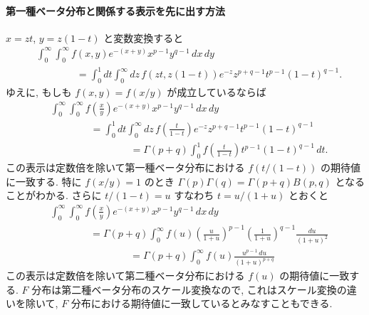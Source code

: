 \documentclass[12pt,twoside]{jarticle}
\theoremstyle{jplain}
\theoremstyle{jplain}
\theoremstyle{jplain}
\numberwithin{theorem}{section}
\numberwithin{equation}{section}
\numberwithin{figure}{section}
\numberwithin{table}{section}
\begin{document}
\paragraph{第一種ベータ分布と関係する表示を先に出す方法}
$x=zt$, $y=z(1-t)$ と変数変換すると
\begin{align*}
&
\int_0^\infty\int_0^\infty f(x,y)e^{-(x+y)}x^{p-1}y^{q-1}\,dx\,dy
\\ & \qquad\qquad
=\int_0^1 dt \int_0^\infty dz\, f(zt,z(1-t))e^{-z}z^{p+q-1}t^{p-1}(1-t)^{q-1}.
\end{align*}
ゆえに, もしも $f(x,y)=f(x/y)$ が成立しているならば
\begin{align*}
&
\int_0^\infty\int_0^\infty f\left(\frac{x}{y}\right)e^{-(x+y)}x^{p-1}y^{q-1}\,dx\,dy
\\ & \qquad\qquad
=\int_0^1 dt \int_0^\infty dz\, f\left(\frac{t}{1-t}\right)e^{-z}z^{p+q-1}t^{p-1}(1-t)^{q-1}
\\ & \qquad\qquad\qquad\qquad
=\Gamma(p+q)\int_0^1 f\left(\frac{t}{1-t}\right)t^{p-1}(1-t)^{q-1}\,dt.
\end{align*}
この表示は定数倍を除いて第一種ベータ分布における $f(t/(1-t))$ の期待値に一致する.
特に $f(x/y)=1$ のとき $\Gamma(p)\Gamma(q)=\Gamma(p+q)B(p,q)$ となることがわかる.
さらに $t/(1-t)=u$ すなわち $t=u/(1+u)$ とおくと
\begin{align*}
&
\int_0^\infty\int_0^\infty f\left(\frac{x}{y}\right)e^{-(x+y)}x^{p-1}y^{q-1}\,dx\,dy
\\ & \qquad\qquad
=\Gamma(p+q)\int_0^\infty f(u)
\left(\frac{u}{1+u}\right)^{p-1}\left(\frac{1}{1+u}\right)^{q-1}\frac{du}{(1+u)^2}
\\ & \qquad\qquad\qquad\qquad
=\Gamma(p+q)\int_0^\infty f(u)\frac{u^{p-1}\,du}{(1+u)^{p+q}}
\end{align*}
この表示は定数倍を除いて第二種ベータ分布における $f(u)$ の期待値に一致する.
$F$ 分布は第二種ベータ分布のスケール変換なので,
これはスケール変換の違いを除いて, 
$F$ 分布における期待値に一致しているとみなすこともできる.
\end{document}
